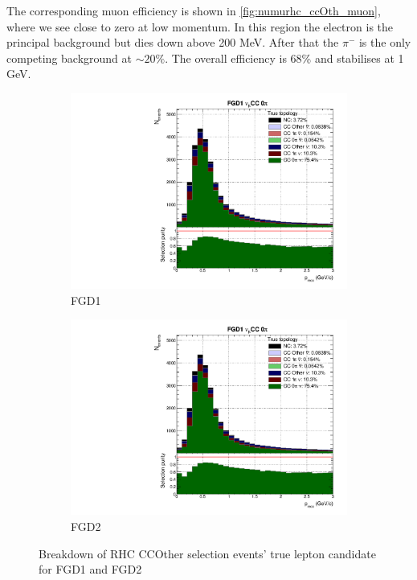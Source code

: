 The corresponding muon efficiency is shown in \autoref{fig:numurhc_ccOth_muon}, where we see close to zero at low momentum. In this region the electron is the principal background but dies down above 200 MeV. After that the $\pi^-$ is the only competing background at $\sim20\%$. The overall efficiency is 68\% and stabilises at 1 GeV.
\begin{figure}[h]
	\begin{subfigure}[t]{0.49\textwidth}
		\includegraphics[width=\textwidth,page=30, trim={0mm 0mm 0mm 9mm}, clip]{figures/mach3/2018/Selection/2018_FullNoRedNDmatrix_rebin_verbose_may_diagnostics}
		\caption{FGD1}
	\end{subfigure}
	\begin{subfigure}[t]{0.49\textwidth}
		\includegraphics[width=\textwidth,page=36, trim={0mm 0mm 0mm 9mm}, clip]{figures/mach3/2018/Selection/2018_FullNoRedNDmatrix_rebin_verbose_may_diagnostics}
		\caption{FGD2}
	\end{subfigure}
	\caption{Breakdown of \numu RHC CCOther selection events' true lepton candidate for FGD1 and FGD2}
	\label{fig:numurhc_ccOth_muon}
\end{figure}

